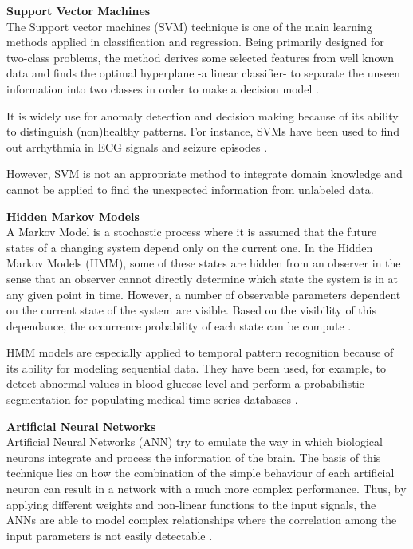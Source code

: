 \begin{description}
	
	\item{\textbf{Support Vector Machines}\hfill \\
	The Support vector machines (SVM) technique is one of the main learning methods applied in classification and regression. Being primarily designed for two-class problems, the method derives some selected features from well known data and finds the optimal hyperplane -a linear classifier- to separate the unseen information into two classes in order to make a decision model \cite{cortes1995support}. 

	It is widely use for anomaly detection and decision making because of its ability to distinguish (non)healthy patterns. For instance, SVMs have been used to find out arrhythmia in ECG signals \cite{hu2008robust} and seizure episodes \cite{lee2012low}. 

	However, SVM is not an appropriate method to integrate domain knowledge and cannot be applied to find the unexpected information from unlabeled data.}

	\item {\textbf{Hidden Markov Models}\hfill \\
	A Markov Model is a stochastic process where it is assumed that the future states of a changing system depend only on the current one. In the Hidden Markov Models (HMM), some of these states are hidden from an observer in the sense that an observer cannot directly determine which state the system is in at any given point in time. However, a number of observable parameters dependent on the current state of the system are visible. Based on the visibility of this dependance, the occurrence probability of each state can be compute \cite{quwaider2008body}.

	HMM models are especially applied to temporal pattern recognition because of its ability for modeling sequential data. They have been used, for example, to detect abnormal values in blood glucose level \cite{zhu2011automatic} and perform a probabilistic segmentation for populating medical time series databases \cite{woodbridge2011salient}.}

	\item {\textbf{Artificial Neural Networks}\hfill \\
	Artificial Neural Networks (ANN) try to emulate the way in which biological neurons integrate and process the information of the brain. The basis of this technique lies on how the combination of the simple behaviour of each artificial neuron can result in a network with a much more complex performance. Thus, by applying different weights and non-linear functions to the input signals, the ANNs are able to model complex relationships where the correlation among the input parameters is not easily detectable \cite{al2011artificial}.

}
\end{description}
